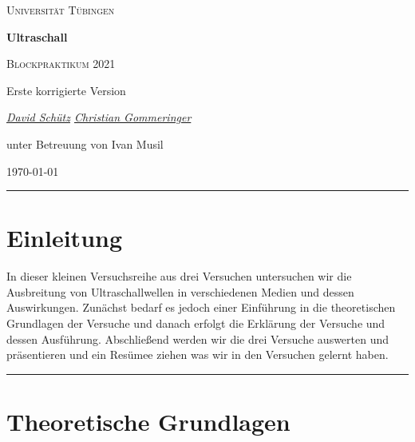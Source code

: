 \documentclass[a4paper, 12pt]{scrartcl}
\begin{document}
\begin{titlepage}
	\centering
	{\scshape\LARGE Universität Tübingen \par}
	\vspace{2cm}
	{\huge\bfseries Ultraschall \par}
	\vspace{2cm}
	{\Large \scshape Blockpraktikum 2021} \par
	\vspace{2cm}
	{\Large  Erste korrigierte Version} \par
	\vspace{2cm}
	{\Large\itshape \underline{David Schütz} \space \space  \underline{Christian Gommeringer}\par}
	\vfill 
	{\large unter Betreuung von Ivan Musil}
	\vfill

	{\large \today\par}
\end{titlepage}
\newpage 
\tableofcontents 
\vfill
\noindent\rule[1ex]{\textwidth}{0.25pt}
\newpage
\section{Einleitung}
\begin{flushleft}
In dieser kleinen Versuchsreihe aus drei Versuchen untersuchen wir die Ausbreitung von Ultraschallwellen in verschiedenen Medien und dessen Auswirkungen. Zunächst bedarf es jedoch einer Einführung in die theoretischen Grundlagen der Versuche und danach erfolgt die Erklärung der Versuche und dessen Ausführung. Abschließend werden wir die drei Versuche auswerten und präsentieren und ein Resümee ziehen was wir in den Versuchen gelernt haben. 
\end{flushleft}

\vfill
\noindent\rule[1ex]{\textwidth}{0.25pt}
\newpage
\section{Theoretische Grundlagen}  
\end{document}
